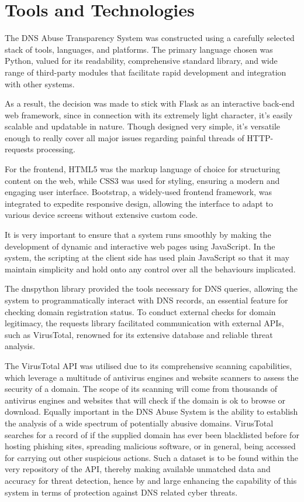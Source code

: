 \section{Tools and Technologies}

The DNS Abuse Transparency System was constructed using a carefully selected stack of tools, languages, and platforms. The primary language chosen was Python, valued for its readability, comprehensive standard library, and wide range of third-party modules that facilitate rapid development and integration with other systems.

As a result, the decision was made to stick with Flask as an interactive back-end web framework, since in connection with its extremely light character, it's easily scalable and updatable in nature. Though designed very simple, it's versatile enough to really cover all major issues regarding painful threads of HTTP-requests processing.

For the frontend, HTML5 was the markup language of choice for structuring content on the web, while CSS3 was used for styling, ensuring a modern and engaging user interface. Bootstrap, a widely-used frontend framework, was integrated to expedite responsive design, allowing the interface to adapt to various device screens without extensive custom code.

It is very important to ensure that a system runs smoothly by making the development of dynamic and interactive web pages using JavaScript. In the system, the scripting at the client side has used plain JavaScript so that it may maintain simplicity and hold onto any control over all the behaviours implicated.

The dnspython library provided the tools necessary for DNS queries, allowing the system to programmatically interact with DNS records, an essential feature for checking domain registration status. To conduct external checks for domain legitimacy, the requests library facilitated communication with external APIs, such as VirusTotal, renowned for its extensive database and reliable threat analysis. 

The VirusTotal API was utilised due to its comprehensive scanning capabilities, which leverage a multitude of antivirus engines and website scanners to assess the security of a domain. The scope of its scanning will come from thousands of antivirus engines and websites that will check if the domain is ok to browse or download. Equally important in the DNS Abuse System is the ability to establish the analysis of a wide spectrum of potentially abusive domains. VirusTotal searches for a record of if the supplied domain has ever been blacklisted before for hosting phishing sites, spreading malicious software, or in general, being accessed for carrying out other suspicious actions. Such a dataset is to be found within the very repository of the API, thereby making available unmatched data and accuracy for threat detection, hence by and large enhancing the capability of this system in terms of protection against DNS related cyber threats.


